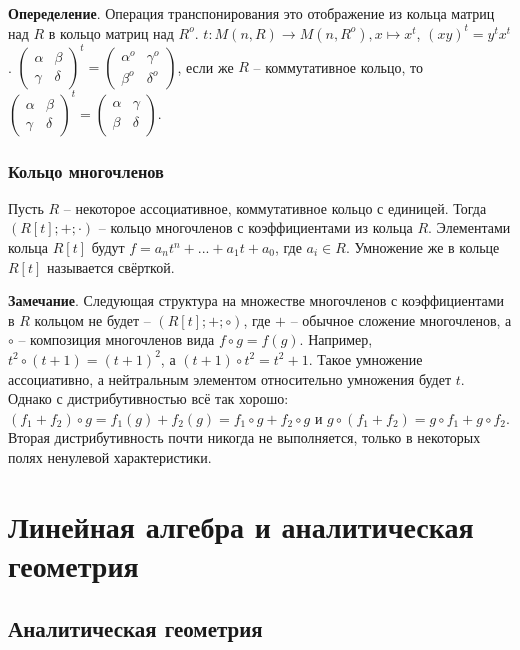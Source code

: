 \documentclass[a4paper]{book}
\begin{document}
\textbf{Опеределение}. Операция транспонирования это отображение из кольца матриц над $R$ в кольцо матриц над $R^o$. $t:M(n,R)\rightarrow M(n,R^o), x \mapsto x^t$, $(xy)^t = y^t x^t$. 
$\begin{pmatrix}
\alpha & \beta\\
\gamma & \delta
\end{pmatrix}^t
=
\begin{pmatrix}
\alpha^o & \gamma^o \\
\beta^o & \delta^o
\end{pmatrix}$, если же $R$ -- коммутативное кольцо, то 
$\begin{pmatrix}
\alpha & \beta\\
\gamma & \delta
\end{pmatrix}^t
=
\begin{pmatrix}
\alpha & \gamma \\
\beta & \delta
\end{pmatrix}$. 

\subsection{Кольцо многочленов}

Пусть $R$ -- некоторое ассоциативное, коммутативное кольцо с единицей. Тогда $(R[t];+;\cdot)$ -- кольцо многочленов с коэффициентами из кольца $R$. Элементами кольца $R[t]$ будут $f=a_n t^n +...+a_1 t + a_0$, где $a_i\in R$. Умножение же в кольце $R[t]$ называется свёрткой. 

\textbf{Замечание}. Следующая структура на множестве многочленов с коэффициентами в $R$ кольцом не будет -- $(R[t];+;\circ)$, где $+$ -- обычное сложение многочленов, а $\circ$ -- композиция многочленов вида $f\circ g = f(g)$. Например, $t^2 \circ (t+1) = (t+1)^2$, а $(t+1)\circ t^2 = t^2 + 1$. Такое умножение ассоциативно, а нейтральным элементом относительно умножения будет $t$. Однако с дистрибутивностью всё так хорошо: $(f_1+f_2)\circ g = f_1(g) + f_2(g) = f_1 \circ g + f_2 \circ g$ и $g\circ(f_1+f_2) = g\circ f_1 + g\circ f_2$. Вторая дистрибутивность почти никогда не выполняется, только в некоторых полях ненулевой характеристики.  

\chapter{Линейная алгебра и аналитическая геометрия}


\section{Аналитическая геометрия}
\end{document}
